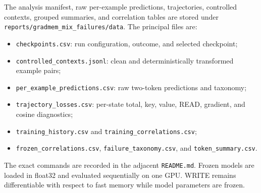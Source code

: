 \documentclass{article}
\begin{document}
The analysis manifest, raw per-example predictions, trajectories, controlled contexts, grouped summaries, and correlation tables are stored under \texttt{reports/gradmem\_mix\_failures/data}.  The principal files are:
\begin{itemize}
  \item \texttt{checkpoints.csv}: run configuration, outcome, and selected checkpoint;
  \item \texttt{controlled\_contexts.jsonl}: clean and deterministically transformed example pairs;
  \item \texttt{per\_example\_predictions.csv}: raw two-token predictions and taxonomy;
  \item \texttt{trajectory\_losses.csv}: per-state total, key, value, READ, gradient, and cosine diagnostics;
  \item \texttt{training\_history.csv} and \texttt{training\_correlations.csv};
  \item \texttt{frozen\_correlations.csv}, \texttt{failure\_taxonomy.csv}, and \texttt{token\_summary.csv}.
\end{itemize}
The exact commands are recorded in the adjacent \texttt{README.md}.  Frozen models are loaded in float32 and evaluated sequentially on one GPU.  WRITE remains differentiable with respect to fast memory while model parameters are frozen.
\end{document}
